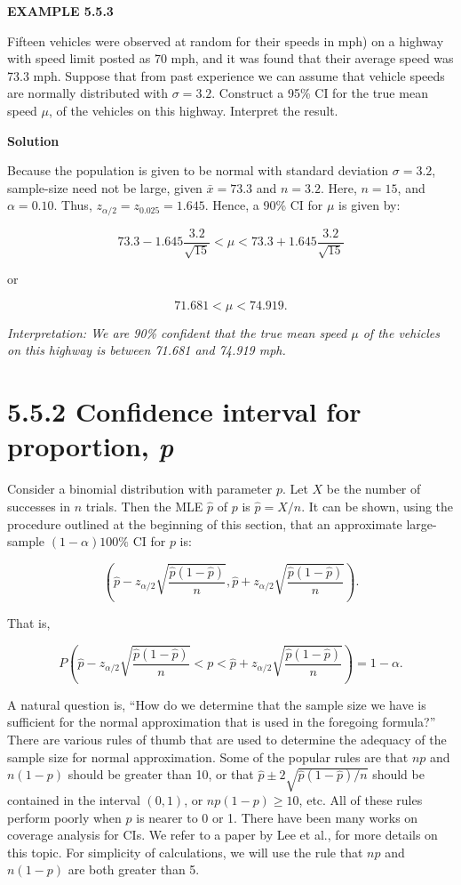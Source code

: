 \textbf{EXAMPLE 5.5.3}

Fifteen vehicles were observed at random for their speeds in mph) on a highway with speed limit posted as 70 mph, and it was found that their average speed was 73.3 mph. Suppose that from past experience we can assume that vehicle speeds are normally distributed with $\sigma = 3.2$. Construct a 95\% CI for the true mean speed $\mu$, of the vehicles on this highway. Interpret the result.

\textbf{Solution}

Because the population is given to be normal with standard deviation $\sigma = 3.2$, sample-size need not be large, given $\bar{x} = 73.3$ and $n = 3.2$. Here, $n = 15$, and $\alpha = 0.10$. Thus, $z_{\alpha/2} = z_{0.025} = 1.645$. Hence, a 90\% CI for $\mu$ is given by:

\[
73.3 - 1.645 \frac{3.2}{\sqrt{15}} < \mu < 73.3 + 1.645 \frac{3.2}{\sqrt{15}}
\]

or

\[
71.681 < \mu < 74.919.
\]

\textit{Interpretation: We are 90\% confident that the true mean speed $\mu$ of the vehicles on this highway is between 71.681 and 74.919 mph.}

\section*{5.5.2 Confidence interval for proportion, \textit{p}}

Consider a binomial distribution with parameter $p$. Let $X$ be the number of successes in $n$ trials. Then the MLE $\hat{p}$ of $p$ is $\hat{p} = X/n$. It can be shown, using the procedure outlined at the beginning of this section, that an approximate large-sample $(1-\alpha)100\%$ CI for $p$ is:

\[
\left( \hat{p} - z_{\alpha/2} \sqrt{\frac{\hat{p}(1-\hat{p})}{n}}, \hat{p} + z_{\alpha/2} \sqrt{\frac{\hat{p}(1-\hat{p})}{n}} \right).
\]

That is,

\[
P\left( \hat{p} - z_{\alpha/2} \sqrt{\frac{\hat{p}(1-\hat{p})}{n}} < p < \hat{p} + z_{\alpha/2} \sqrt{\frac{\hat{p}(1-\hat{p})}{n}} \right) = 1 - \alpha.
\]

A natural question is, ``How do we determine that the sample size we have is sufficient for the normal approximation that is used in the foregoing formula?'' There are various rules of thumb that are used to determine the adequacy of the sample size for normal approximation. Some of the popular rules are that $np$ and $n(1-p)$ should be greater than 10, or that $\hat{p} \pm 2\sqrt{\hat{p}(1-\hat{p})/n}$ should be contained in the interval $(0,1)$, or $np(1-p) \geq 10$, etc. All of these rules perform poorly when $p$ is nearer to 0 or 1. There have been many works on coverage analysis for CIs. We refer to a paper by Lee et al., for more details on this topic. For simplicity of calculations, we will use the rule that $np$ and $n(1-p)$ are both greater than 5.

